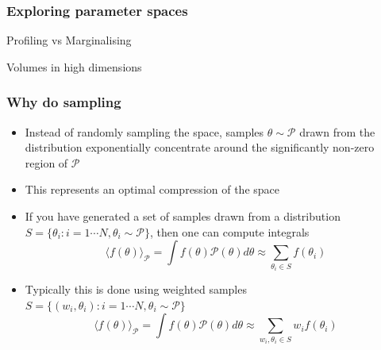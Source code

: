 \documentclass[aspectratio=169]{beamer}
\begin{document}

\begin{frame}
    \frametitle{Exploring parameter spaces}
    Profiling vs Marginalising

    Volumes in high dimensions
    
\end{frame}


\begin{frame}
    \frametitle{Why do sampling}
    \begin{itemize}
        \item Instead of randomly sampling the space, samples $\theta\sim\mathcal{P}$ drawn from the distribution exponentially concentrate around the significantly non-zero region of $\mathcal{P}$
        \item This represents an optimal compression of the space
        \item If you have generated a set of samples drawn from a distribution $S=\{\theta_i : i=1\cdots N,\theta_i\sim\mathcal{P}\}$, then one can compute integrals
            \[ \langle f(\theta) \rangle_\mathcal{P} = \int f(\theta) \mathcal{P}(\theta) d\theta \approx \sum_{\theta_i\in S} f(\theta_i) \]
        \item Typically this is done using weighted samples $S=\{(w_i, \theta_i) : i=1\cdots N,\theta_i\sim\mathcal{P}\}$
            \[ \langle f(\theta) \rangle_\mathcal{P} = \int f(\theta) \mathcal{P}(\theta) d\theta \approx \sum_{w_i, \theta_i\in S} w_i f(\theta_i) \]
    \end{itemize}
\end{frame}
\end{document}
